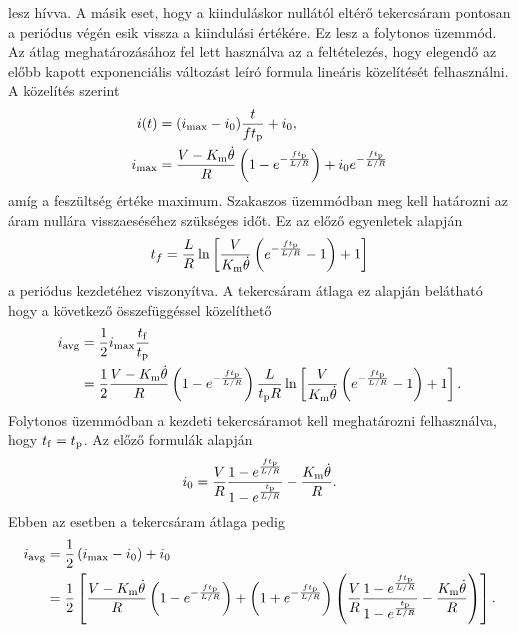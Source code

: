 lesz hívva. A másik eset, hogy a kiinduláskor nullától eltérő tekercsáram pontosan a periódus végén esik vissza a kiindulási értékére. 
Ez lesz a folytonos üzemmód. Az átlag meghatározásához fel lett használva az a feltételezés, hogy elegendő az előbb kapott 
exponenciális változást leíró formula lineáris közelítését felhasználni. A közelítés szerint 
\begin{equation}
    \begin{split}
        i(t) &= (i_{\mathrm{max}} - i_0)\frac{t}{ft_{\mathrm{p}}} + i_0, \\
        i_{\mathrm{max}} &= \frac{V-K_{\mathrm{m}}\dot\theta}{R}\left(1-e^{-\frac{ft_{\mathrm{p}}}{L/R}} \right) + i_0 e^{-\frac{ft_{\mathrm{p}}}{L/R}}
    \end{split}
\end{equation}
amíg a feszültség értéke maximum. Szakaszos üzemmódban meg kell határozni az áram nullára visszaeséséhez szükséges időt. 
Ez az előző egyenletek alapján 
\begin{equation}
    t_f = \frac{L}{R}\ln\left[\frac{V}{K_{\mathrm{m}}\dot\theta}\left(e^{-\frac{ft_{\mathrm{p}}}{L/R}} - 1\right) + 1\right]
\end{equation}
a periódus kezdetéhez viszonyítva.
A tekercsáram átlaga ez alapján belátható hogy a következő összefüggéssel közelíthető
\begin{equation}
    \begin{split}
    i_{\mathrm{avg}} &= \frac{1}{2}i_{\mathrm{max}}\frac{t_{\mathrm{f}}}{t_{\mathrm{p}}} \\
               &= \frac{1}{2}\frac{V-K_{\mathrm{m}}\dot\theta}{R}\left(1-e^{-\frac{ft_{\mathrm{p}}}{L/R}} \right)\frac{L}{t_{\mathrm{p}} R}\ln\left[\frac{V}{K_{\mathrm{m}}\dot\theta}\left(e^{-\frac{ft_{\mathrm{p}}}{L/R}} - 1\right) + 1\right].
    \end{split}
\end{equation}
Folytonos üzemmódban a kezdeti tekercsáramot kell meghatározni felhasználva, hogy \(t_{\mathrm{f}} = t_{\mathrm{p}}\).
Az előző formulák alapján 
\begin{equation}
    i_0 = \frac{V}{R}\frac{1-e^{\frac{ft_{\mathrm{p}}}{L/R}}}{1-e^{\frac{t_{\mathrm{p}}}{L/R}}} - \frac{K_{\mathrm{m}}\dot\theta}{R}.
\end{equation}
Ebben az esetben a tekercsáram átlaga pedig
\begin{equation}
    \begin{split}
    i_{\mathrm{avg}} &= \frac{1}{2}\left(i_{\mathrm{max}}-i_0\right) + i_0 \\
               &= \frac{1}{2}\left[\frac{V-K_{\mathrm{m}}\dot\theta}{R}\left(1-e^{-\frac{ft_{\mathrm{p}}}{L/R}} \right) + 
               \left(1+e^{-\frac{ft_{\mathrm{p}}}{L/R}} \right)
               \left(\frac{V}{R}\frac{1-e^{\frac{ft_{\mathrm{p}}}{L/R}}}{1-e^{\frac{t_{\mathrm{p}}}{L/R}}} - \frac{K_{\mathrm{m}}\dot\theta}{R}\right)\right].
    \end{split}
\end{equation}
